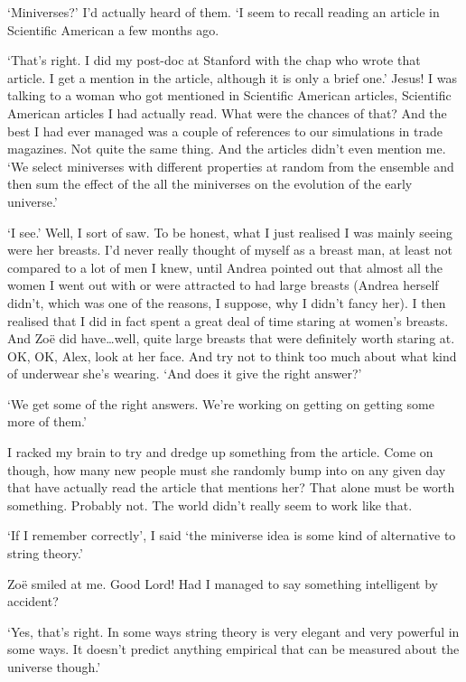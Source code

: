 `Miniverses?' I'd actually heard of them. `I seem to recall reading
an article in {\twelvesl Scientific American\/} a few months ago.

`That's right. I did my post-doc at Stanford with the chap who wrote
that article. I get a mention in the article, although it is only a
brief one.' Jesus! I was talking to a woman who got mentioned in
{\twelvesl Scientific American\/} articles, {\twelvesl Scientific American\/} articles I had actually read. What were the chances of that? And the best I had ever
managed was a couple of references to our simulations in trade
magazines. Not quite the same thing. And the articles didn't even
mention me. `We select miniverses with different properties at
random from the ensemble and then sum the effect of the all the
miniverses on the evolution of the early universe.'

`I see.' Well, I sort of saw. To be honest, what I just realised I
was mainly seeing were her breasts. I'd never really thought of
myself as a breast man, at least not compared to a lot of men I
knew, until Andrea pointed out that almost all the women I went out
with or were attracted to had large breasts (Andrea herself didn't,
which was one of the reasons, I suppose, why I didn't fancy her). I
then realised that I did in fact spent a great deal of time staring
at women's breasts. And Zoë did have\dots well, quite large
breasts that were definitely worth staring at. OK, OK, Alex, look at
her face. And try not to think {\twelveit too} much about what kind
of underwear she's wearing. `And does it give the right answer?'

`We get some of the right answers. We're working on getting on
getting some more of them.'

I racked my brain to try and dredge up something from the article.
Come on though, how many new people must she randomly bump into on any given day
that have actually read the article that mentions her? That alone must be
worth {\twelveit something}. Probably not. The world didn't really
seem to work like that.

`If I remember correctly', I said `the miniverse idea is some kind
of alternative to string theory.'

Zoë smiled at me. Good Lord! Had I managed to say something
intelligent by accident?

`Yes, that's right. In some ways string theory is very elegant and
very powerful in some ways. It doesn't predict anything empirical that can be
measured about the universe though.'

